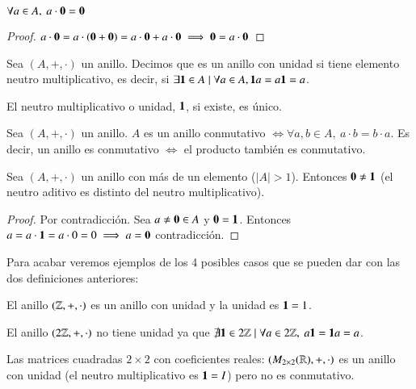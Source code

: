 \begin{pro}
	$\forall a \in A,\ a\cdot \mathbf{0} = \mathbf{0}$
\end{pro}

\begin{proof}
	$a \cdot \mathbf{0} = a \cdot(\mathbf{0} + \mathbf{0}) = a\cdot \mathbf{0} + a\cdot \mathbf{0} \implies \mathbf{0} = a\cdot \mathbf{0}$
\end{proof}

\begin{dfn}
	Sea $(A, +, \cdot)$ un anillo. Decimos que es un anillo con unidad si tiene elemento neutro multiplicativo, es decir, si $\exists \mathbf{1} \in A \mid \forall a \in A, \mathbf{1} a = a \mathbf{1} = a$.
\end{dfn}

\begin{pro}
	El neutro multiplicativo o unidad, $\mathbf{1}$, si existe, es único.
\end{pro}


\begin{dfn}
	Sea $(A, +, \cdot)$ un anillo. $A$ es un anillo conmutativo $\iff \forall a, b \in A,\ a\cdot b = b \cdot a$. Es decir, un anillo es conmutativo $\iff$ el producto también es conmutativo.
\end{dfn}

\begin{pro}
	Sea $(A, +, \cdot)$ un anillo con más de un elemento ($|A| > 1$). Entonces $\mathbf{0} \neq \mathbf{1}$ (el neutro aditivo es distinto del neutro multiplicativo).
\end{pro}

\begin{proof}
	Por contradicción. Sea $a \neq \mathbf{0} \in A$ y $\mathbf{0} = \mathbf{1}$. Entonces $a = a\cdot \mathbf{1} = a\cdot 0 = 0 \implies a = \mathbf{0}$ contradicción.
\end{proof}

Para acabar veremos ejemplos de los 4 posibles casos que se pueden dar con las dos definiciones anteriores:

\begin{ej}
	El anillo $(\mathbb{Z}, +, \cdot)$ es un anillo con unidad y la unidad es $\mathbf{1} = 1$.
\end{ej}

\begin{ej}
	El anillo $(2\mathbb{Z}, +, \cdot)$ no tiene unidad ya que $\nexists \mathbf{1} \in 2\mathbb{Z} \mid \forall a \in 2\mathbb{Z},\ a\mathbf{1} = \mathbf{1}a = a$.
\end{ej}

\begin{ej}
	Las matrices cuadradas $2\times 2$ con coeficientes reales: $(M_{2\times 2}(\mathbb{R}), +, \cdot)$ es un anillo con unidad (el neutro multiplicativo es $\mathbf{1} = I$) pero no es conmutativo.
\end{ej}

